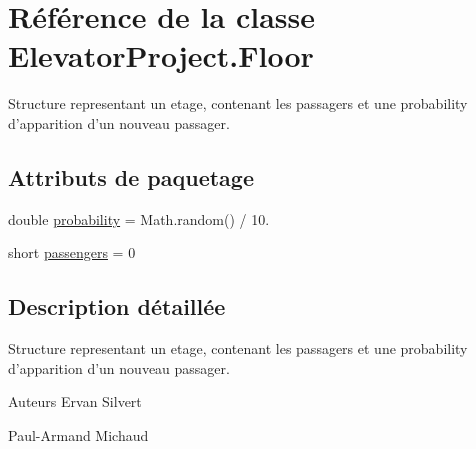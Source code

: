 \hypertarget{classElevatorProject_1_1Floor}{\section{Référence de la classe Elevator\-Project.\-Floor}
\label{classElevatorProject_1_1Floor}
}


Structure representant un etage, contenant les passagers et une probability d'apparition d'un nouveau passager.  


\subsection*{Attributs de paquetage}
\begin{DoxyCompactItemize}
\item 
double \hyperlink{classElevatorProject_1_1Floor_a922b09a13af5c5cd50dfa2b63ef292ac}{probability} = Math.\-random() / 10.
\item 
short \hyperlink{classElevatorProject_1_1Floor_ab591e528b2bc6e951fdbf3f666faefb3}{passengers} = 0
\end{DoxyCompactItemize}


\subsection{Description détaillée}
Structure representant un etage, contenant les passagers et une probability d'apparition d'un nouveau passager. 

\begin{DoxyAuthor}{Auteurs}
Ervan Silvert 

Paul-\/\-Armand Michaud 
\end{DoxyAuthor}


